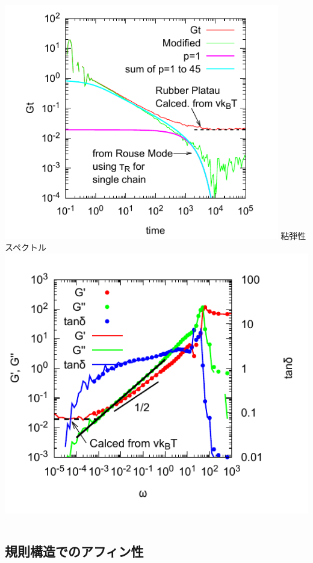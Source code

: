 \documentclass[12pt, dvipdfmx]{beamer}
\begin{document}
\begin{frame}
\begin{columns}[totalwidth=1\textwidth]
				\includegraphics[width=0.9\textwidth]{Gt_loglog.pdf}
				\scriptsize
				粘弾性スペクトル
				\includegraphics[width=\textwidth]{N_44_Freq_Sweep.pdf}
		\end{columns}
\end{frame}

\subsection{規則構造でのアフィン性}
\end{document}
